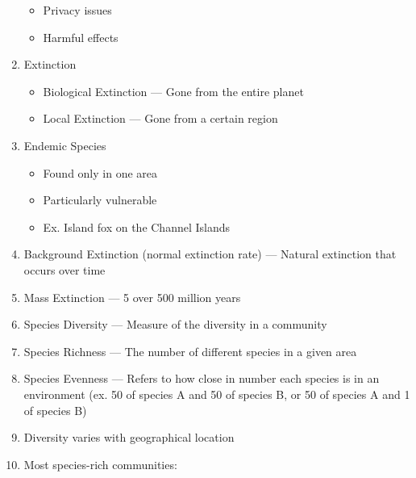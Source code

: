 \documentclass[12pt]{article}
\begin{document}
\begin{enumerate}
\begin{itemize}
      \item Privacy issues

      \item Harmful effects

    \end{itemize}

  \item Extinction

    \begin{itemize}

      \item Biological Extinction — Gone from the entire planet

      \item Local Extinction — Gone from a certain region

    \end{itemize}

  \item Endemic Species

    \begin{itemize}

      \item Found only in one area

      \item Particularly vulnerable

      \item Ex. Island fox on the Channel Islands

    \end{itemize}

  \item Background Extinction (normal extinction rate) — Natural extinction that occurs over time


  \item Mass Extinction — 5 over 500 million years

  \item Species Diversity — Measure of the diversity in a community

  \item Species Richness — The number of different species in a given area

  \item Species Evenness — Refers to how close in number each species is in an environment (ex. 50 of species A and 50 of species B, or 50 of species A and 1 of species B)

  \item Diversity varies with geographical location

  \item Most species-rich communities:


\end{enumerate}
\end{document}

